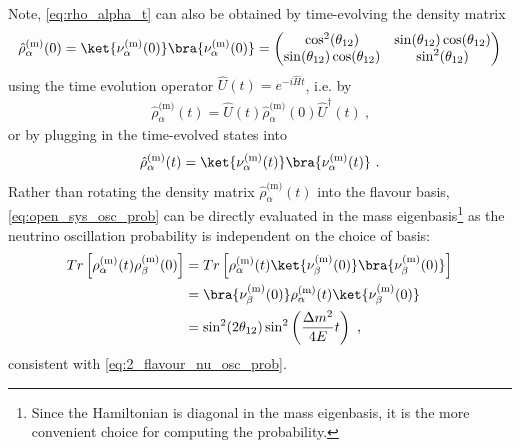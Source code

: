 %
Note, \cref{eq:rho_alpha_t} can also be obtained by time-evolving the density matrix
%
\begin{align} \label{eq:rho_alpha_0}
    \hat{\rho}^\text{(m)}_\alpha(0) = \ket{\nu^\text{(m)}_\alpha(0)} \bra{\nu^\text{(m)}_\alpha(0)} =
    \begin{pmatrix}
        \cos^2(\theta_{12}) & \sin(\theta_{12})\cos(\theta_{12}) \\
        \sin(\theta_{12})\cos(\theta_{12}) & \sin^2(\theta_{12}) \\
    \end{pmatrix}
\end{align}
%
using the time evolution operator $\hat{U}(t)=e^{-i\hat{H}t}$, i.e. by 
%
\begin{align} \label{eq:rho_alpha_time_evolution}
    \hat{\rho}^\text{(m)}_\alpha(t) = \hat{U}(t) \hat{\rho}^\text{(m)}_\alpha(0) \hat{U}^\dagger(t) \ \text{,}
\end{align}
%
or by plugging in the time-evolved states into
%
\begin{align} \label{eq:rho_alpha_t_eq}
    \hat{\rho}^\text{(m)}_\alpha(t) = \ket{\nu^\text{(m)}_\alpha(t)} \bra{\nu^\text{(m)}_\alpha(t)} \ .
\end{align}
%
Rather than rotating the density matrix $\hat{\rho}^\text{(m)}_\alpha(t)$ into the flavour basis, \cref{eq:open_sys_osc_prob} can be directly evaluated in the mass eigenbasis\footnote{Since the Hamiltonian is diagonal in the mass eigenbasis, it is the more convenient choice for computing the probability.} as the neutrino oscillation probability is independent on the choice of basis:
%
\begin{align} \label{eq:2_flavour_open_qs_osc_prob}
    Tr\left[\rho^\text{(m)}_\alpha(t)\rho^\text{(m)}_\beta(0)\right]
    &=
    Tr\left[\rho^\text{(m)}_\alpha(t) \ket{\nu^\text{(m)}_\beta(0)} \bra{\nu^\text{(m)}_\beta(0)} \right] \\
    &=
    \bra{\nu^\text{(m)}_\beta(0)} \rho^\text{(m)}_\alpha(t) \ket{\nu^\text{(m)}_\beta(0)} \\
    &=
    \sin^2(2\theta_{12}) \sin^2\left(\frac{\Delta m ^2}{4E}t\right)
    \ \text{,}
\end{align}
%
consistent with \cref{eq:2_flavour_nu_osc_prob}.